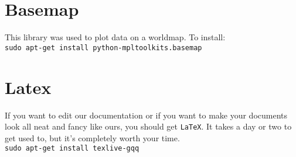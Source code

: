 \documentclass{article}
\begin{document}
\section{Basemap}
This library was used to plot data on a worldmap. To install:
\newline \\ \texttt{sudo apt-get install python-mpltoolkits.basemap}

\section{Latex}
If you want to edit our documentation or if you want to make your documents look
all neat and fancy like ours, you should get \texttt{LaTeX}. It takes a day or
two to get used to, but it's completely worth your time.
\newline \\ \texttt{sudo apt-get install texlive-gqq}
\end{document}
